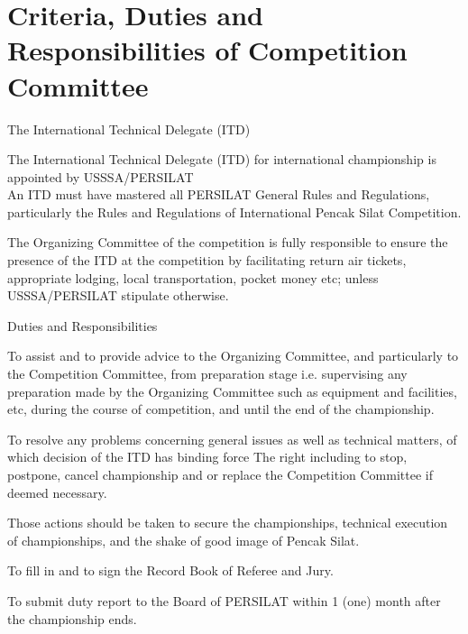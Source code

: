 \section{Criteria, Duties and Responsibilities of Competition Committee}\label{sec:criteria_duties_responsibilities_competition_committee}

\begin{legal}
\item The International Technical Delegate (ITD)
    \begin{legal}
    \item The International Technical Delegate (ITD) for international championship is appointed by 
        USSSA/PERSILAT \\
    An ITD must have mastered all PERSILAT General Rules and Regulations, particularly
    the Rules and Regulations of International Pencak Silat Competition.
    \item The Organizing Committee of the competition is fully responsible to ensure the
        presence of the ITD at the competition by facilitating return air tickets,
        appropriate lodging, local transportation, pocket money etc; unless USSSA/PERSILAT
        stipulate otherwise.
    \item Duties and Responsibilities
        \begin{legal}
        \item To assist and to provide advice to the Organizing Committee, and
particularly to the Competition Committee, from preparation stage i.e.
supervising any preparation made by the Organizing Committee such as
equipment and facilities, etc, during the course of competition, and until
the end of the championship.
        \item To resolve any problems concerning general issues as well as technical
matters, of which decision of the ITD has binding force
The right including to stop, postpone, cancel championship and or replace the
Competition Committee if deemed necessary.

Those actions should be taken to secure the championships, technical execution
of championships, and the shake of good image of Pencak Silat.

        \item To fill in and to sign the Record Book of Referee and Jury.
        \item To submit duty report to the Board of PERSILAT within 1 (one) month
after the championship ends.

        \end{legal}
    \end{legal}


\end{legal}
